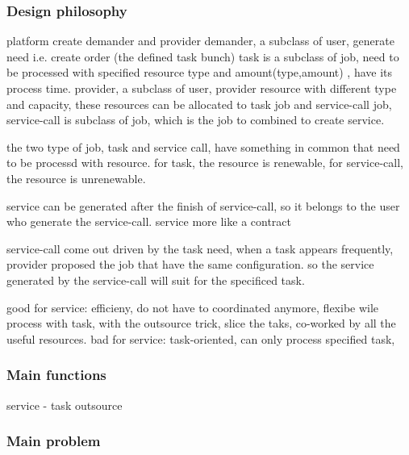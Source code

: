 \subsubsection{Design philosophy} %
\label{ssub:design_philosophy}
platform create demander and provider
demander, a subclass of user, generate need i.e. create order (the defined task bunch)
    task is a subclass of job, need to be processed with specified resource type and amount(type,amount) , have its process time.
provider, a subclass of user, provider resource with different type and capacity, these resources can be allocated to task job and service-call job, service-call is subclass of job, which is the job to combined to create service.

the two type of job, task and service call, have something in common that need to be processd with resource. for task, the resource is renewable, for service-call, the resource is unrenewable.

service can be generated after the finish of service-call, so it belongs to the user who generate the service-call. service more like a contract

service-call come out driven by the task need, when a task appears frequently, provider proposed the job that have the same configuration. so the service generated by the service-call will suit for the specificed task.

good for service: efficieny, do not have to coordinated anymore, flexibe wile process with task, with the outsource trick, slice the taks, co-worked by all the useful resources.
bad for service: task-oriented, can only process specified task,


\subsubsection{Main functions} %
\label{ssub:main_functions}
service - task outsource

\subsubsection{Main problem} %
\label{ssub:main_problem}


